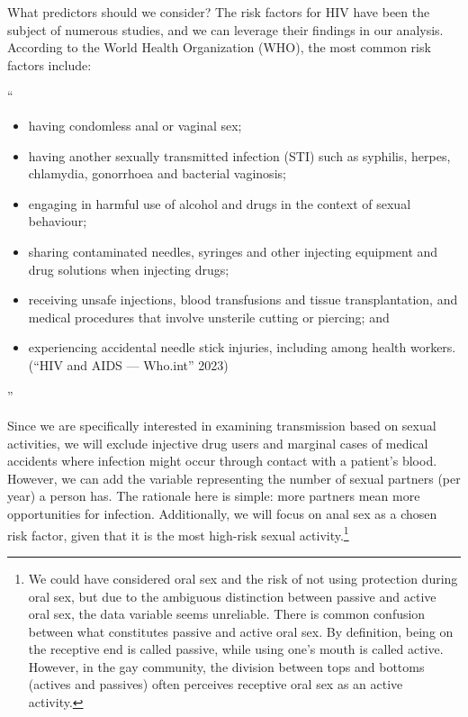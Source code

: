 \documentclass[
  12pt,
  letterpaper,
  DIV=11,
  numbers=noendperiod]{scrartcl}
\providecommand{\tightlist}{%
  \setlength{\itemsep}{0pt}\setlength{\parskip}{0pt}}\usepackage{longtable,booktabs,array}
\renewenvironment{quote}
{\list{}{\leftmargin=1em\rightmargin=1em}\item[]``}
{''\endlist}
\begin{document}
What predictors should we consider? The risk factors for HIV have been
the subject of numerous studies, and we can leverage their findings in
our analysis. According to the World Health Organization (WHO), the most
common risk factors include:

\begin{quote}
\begin{itemize}
\tightlist
\item
  having condomless anal or vaginal sex;
\item
  having another sexually transmitted infection (STI) such as syphilis,
  herpes, chlamydia, gonorrhoea and bacterial vaginosis;
\item
  engaging in harmful use of alcohol and drugs in the context of sexual
  behaviour;
\item
  sharing contaminated needles, syringes and other injecting equipment
  and drug solutions when injecting drugs;
\item
  receiving unsafe injections, blood transfusions and tissue
  transplantation, and medical procedures that involve unsterile cutting
  or piercing; and
\item
  experiencing accidental needle stick injuries, including among health
  workers. ({``{H}{I}{V} and {A}{I}{D}{S} --- Who.int''} 2023)
\end{itemize}
\end{quote}

Since we are specifically interested in examining transmission based on
sexual activities, we will exclude injective drug users and marginal
cases of medical accidents where infection might occur through contact
with a patient's blood. However, we can add the variable representing
the number of sexual partners (per year) a person has. The rationale
here is simple: more partners mean more opportunities for infection.
Additionally, we will focus on anal sex as a chosen risk factor, given
that it is the most high-risk sexual activity.\footnote{We could have
  considered oral sex and the risk of not using protection during oral
  sex, but due to the ambiguous distinction between passive and active
  oral sex, the data variable seems unreliable. There is common
  confusion between what constitutes passive and active oral sex. By
  definition, being on the receptive end is called passive, while using
  one's mouth is called active. However, in the gay community, the
  division between tops and bottoms (actives and passives) often
  perceives receptive oral sex as an active activity.}
\end{document}
